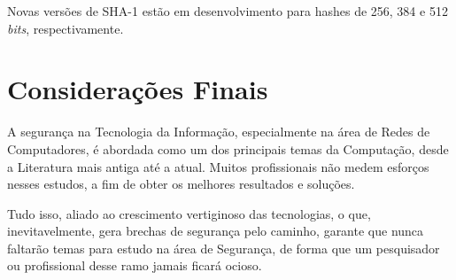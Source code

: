 \documentclass{abnt}
\begin{document}
Novas versões de SHA-1 estão em desenvolvimento para hashes de 256, 384 e 512 \textit{bits}, respectivamente.



\section{Considerações Finais}

A segurança na Tecnologia da Informação, especialmente na área de Redes de Computadores, é abordada como um dos principais temas da Computação, desde a Literatura mais
antiga até a atual. Muitos profissionais não medem esforços nesses estudos, a fim de obter os melhores resultados e soluções.

Tudo isso, aliado ao crescimento vertiginoso das tecnologias, o que, inevitavelmente, gera brechas de segurança pelo caminho, garante que nunca faltarão temas para estudo
na área de Segurança, de forma que um pesquisador ou profissional desse ramo jamais ficará ocioso.




\end{document}
